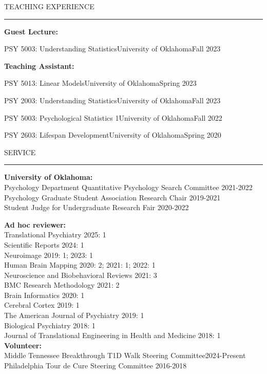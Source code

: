 \documentclass{resume} %
\renewenvironment{rSection}[1]{
	\sectionskip
	\textcolor{CarnegieMellonRed}{\MakeUppercase{#1}}
	\sectionlineskip
	\hrule
	\begin{list}{}{
			\setlength{\leftmargin}{1.5em}
		}
		\item[]
	}{
	\end{list}
}
\begin{document}
	\begin{rSection}{Teaching Experience}
		\bf{Guest Lecture:}\\
		\begin{rSubsectionTeach}{PSY 5003: Understanding Statistics}{University of Oklahoma}{Fall 2023}
		\end{rSubsectionTeach}
		
		\bf{Teaching Assistant:}\\
		\begin{rSubsectionTeach}{PSY 5013: Linear Models}{University of Oklahoma}{Spring 2023}
		\end{rSubsectionTeach}
		\begin{rSubsectionTeach}{PSY 2003: Understanding Statistics}{University of Oklahoma}{Fall 2023}
		\end{rSubsectionTeach}
		\begin{rSubsectionTeach}{PSY 5003: Psychological Statistics 1}{University of Oklahoma}{Fall 2022}
		\end{rSubsectionTeach}
		\begin{rSubsectionTeach}{PSY 2603: Lifespan Development}{University of Oklahoma}{Spring 2020}
		\end{rSubsectionTeach}
		
	\end{rSection}
	
	\begin{rSection}{Service}
		\textbf{University of Oklahoma:} \\
		Psychology Department Quantitative Psychology Search Committee \hfill2021-2022 \\
		Psychology Graduate Student Association Research Chair \hfill2019-2021 \\
		Student Judge for Undergraduate Research Fair \hfill2020-2022
		
		\textbf{Ad hoc reviewer:}\\
		Translational Psychiatry \hfill 2025: 1\\
		Scientific Reports \hfill2024: 1 \\
		Neuroimage \hfill2019: 1; 2023: 1 \\
		Human Brain Mapping \hfill2020: 2; 2021: 1; 2022: 1 \\
		Neuroscience and Biobehavioral Reviews \hfill2021: 3 \\
		BMC Research Methodology \hfill2021: 2 \\
		Brain Informatics \hfill2020: 1 \\
		Cerebral Cortex \hfill2019: 1 \\
		The American Journal of Psychiatry \hfill2019: 1 \\
		Biological Psychiatry \hfill2018: 1 \\
		Journal of Translational Engineering in Health and Medicine \hfill2018: 1 \\
		
		\textbf{Volunteer:}\\
		Middle Tennessee Breakthrough T1D Walk Steering Committee\hfill 2024-Present\\
		Philadelphia Tour de Cure Steering Committee \hfill2016-2018
	\end{rSection}
	
\end{document}
